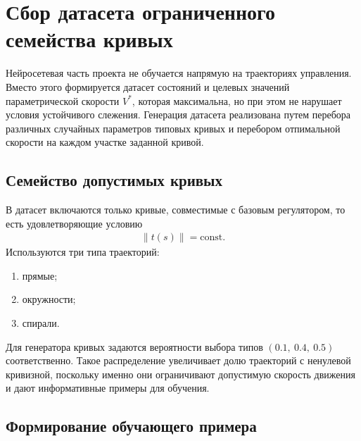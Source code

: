 ﻿%
\section{Сбор датасета ограниченного семейства кривых}
\label{sec:dataset}

Нейросетевая часть проекта не обучается напрямую на траекториях управления. 
Вместо этого формируется датасет состояний и целевых значений параметрической скорости $V^{\ast}$, которая максимальна, но при этом не нарушает условия устойчивого слежения. 
Генерация датасета реализована путем перебора различных случайных параметров типовых кривых и перебором отпимальной скорости на каждом участке заданной кривой.

\subsection{Семейство допустимых кривых}

В датасет включаются только кривые, совместимые с базовым регулятором, то есть удовлетворяющие условию
\begin{gather}
    \|t(s)\| = \mathrm{const}.
\end{gather}
Используются три типа траекторий:
\begin{enumerate}
    \item прямые;
    \item окружности;
    \item спирали.
\end{enumerate}

Для генератора кривых задаются вероятности выбора типов $(0.1,\ 0.4,\ 0.5)$ соответственно. Такое распределение увеличивает долю траекторий с ненулевой кривизной, поскольку именно они ограничивают допустимую скорость движения и дают информативные примеры для обучения.

\subsection{Формирование обучающего примера}

